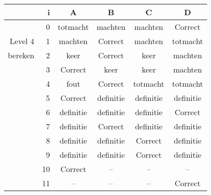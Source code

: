 \begin{tabular}{ rr| c|c|c|c}\hline\hline
     & i & \textbf{A} & \textbf{B} & \textbf{C} & \textbf{D}\\\hline

&0&totmacht&machten&machten&Correct\cellcolor[gray]{0.6}\\
Level 4 & 1&machten&Correct\cellcolor[gray]{0.6}&machten&totmacht\\
bereken &2&keer&Correct\cellcolor[gray]{0.6}&keer&machten\\
&3&Correct\cellcolor[gray]{0.6}&keer&keer&machten\\
&4&fout&Correct\cellcolor[gray]{0.6}&totmacht&totmacht\\
&5&Correct\cellcolor[gray]{0.6}&definitie&definitie&definitie\\
&6&definitie&definitie&definitie&Correct\cellcolor[gray]{0.6}\\
&7&definitie&Correct\cellcolor[gray]{0.6}&definitie&definitie\\
&8&definitie&definitie&Correct\cellcolor[gray]{0.6}&definitie\\
&9&definitie&definitie&Correct\cellcolor[gray]{0.6}&definitie\\
&10&Correct\cellcolor[gray]{0.6}&--&--&--\\
&11&--&--&--&Correct\cellcolor[gray]{0.6}\\
\hline\end{tabular}\par\ \newline

